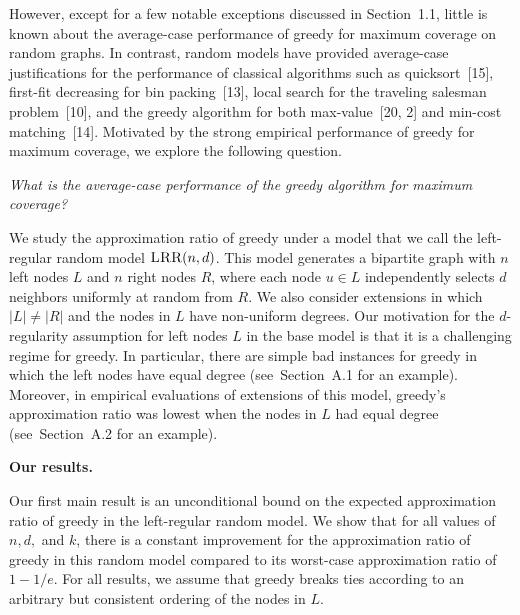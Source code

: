 \documentclass[10pt,a4paper]{article}
\begin{document}
However, except for a few notable exceptions discussed in Section 1.1, little is known about the average-case performance of greedy for maximum coverage on random graphs. In contrast, random models have provided average-case justifications for the performance of classical algorithms such as quicksort [15], first-fit decreasing for bin packing [13], local search for the traveling salesman problem [10], and the greedy algorithm for both max-value [20, 2] and min-cost matching [14]. Motivated by the strong empirical performance of greedy for maximum coverage, we explore the following question.\par




\emph{What is the average-case performance of the greedy algorithm for maximum coverage? }\par




We study the approximation ratio of greedy under a model that we call the left-regular random model $\textsc{LRR}(n,d)$. This model generates a bipartite graph with $n$ left nodes $L$ and $n$ right nodes $R$, where each node $u\in L$ independently selects $d$ neighbors uniformly at random from $R$. We also consider extensions in which $|L|\neq|R|$ and the nodes in $L$ have non-uniform degrees. Our motivation for the $d$-regularity assumption for left nodes $L$ in the base model is that it is a challenging regime for greedy. In particular, there are simple bad instances for greedy in which the left nodes have equal degree (see Section A.1 for an example). Moreover, in empirical evaluations of extensions of this model, greedy’s approximation ratio was lowest when the nodes in $L$ had equal degree (see Section A.2 for an example).\par




\par\medskip\noindent\textbf{Our results.}\par




Our first main result is an unconditional bound on the expected approximation ratio of greedy in the left-regular random model. We show that for all values of $n,d,$ and $k$, there is a constant improvement for the approximation ratio of greedy in this random model compared to its worst-case approximation ratio of $1-1/e$. For all results, we assume that greedy breaks ties according to an arbitrary but consistent ordering of the nodes in $L$.\par
\end{document}
